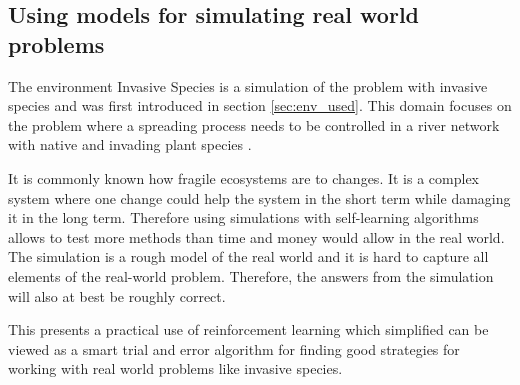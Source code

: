 \subsection{Using models for simulating real world problems}
\label{sec:ethics_inv_spec}


The environment Invasive Species is a simulation of the problem with invasive
species and was first introduced in section \ref{sec:env_used}. This domain
focuses on the problem where a spreading process needs to be controlled in a
river network with native and invading plant species
\parencite{invasiveSpecis2014:Online}. 

It is commonly known how fragile ecosystems are to changes. It is a complex
system where one change could help the system in the short term while damaging it in the long
term. Therefore using simulations with self-learning algorithms allows to test
more methods than time and money would allow in the real world. The simulation is a rough model
of the real world and it is hard to capture all elements of the real-world
problem. Therefore, the answers from the simulation will also at best be roughly
correct.

This presents a practical use of reinforcement learning which simplified can be
viewed as a smart trial and error algorithm for finding good strategies for
working with real world problems like invasive species.
